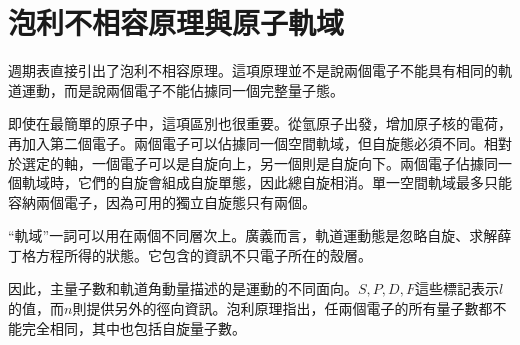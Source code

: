 \begin{classroomqa}
\end{classroomqa}

\section{泡利不相容原理與原子軌域}

週期表直接引出了泡利不相容原理。這項原理並不是說兩個電子不能具有相同的軌道運動，而是說兩個電子不能佔據同一個完整量子態。

即使在最簡單的原子中，這項區別也很重要。從氫原子出發，增加原子核的電荷，再加入第二個電子。兩個電子可以佔據同一個空間軌域，但自旋態必須不同。相對於選定的軸，一個電子可以是自旋向上，另一個則是自旋向下。兩個電子佔據同一個軌域時，它們的自旋會組成自旋單態，因此總自旋相消。單一空間軌域最多只能容納兩個電子，因為可用的獨立自旋態只有兩個。

\begin{classroomqa}
\end{classroomqa}

``軌域''一詞可以用在兩個不同層次上。廣義而言，軌道運動態是忽略自旋、求解薛丁格方程所得的狀態。它包含的資訊不只電子所在的殼層。

\begin{classroomqa}
\end{classroomqa}

因此，主量子數和軌道角動量描述的是運動的不同面向。\(S,P,D,F\)這些標記表示\(l\)的值，而\(n\)則提供另外的徑向資訊。泡利原理指出，任兩個電子的所有量子數都不能完全相同，其中也包括自旋量子數。

\begin{classroomqa}
\end{classroomqa}

